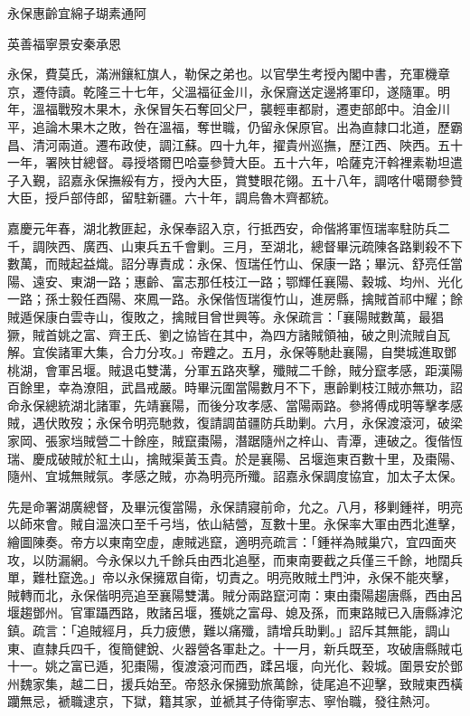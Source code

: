 
\begin{pinyinscope}
永保惠齡宜綿子瑚素通阿

英善福寧景安秦承恩

永保，費莫氏，滿洲鑲紅旗人，勒保之弟也。以官學生考授內閣中書，充軍機章京，遷侍讀。乾隆三十七年，父溫福征金川，永保齎送定邊將軍印，遂隨軍。明年，溫福戰歿木果木，永保冒矢石奪回父尸，襲輕車都尉，遷吏部郎中。洎金川平，追論木果木之敗，咎在溫福，奪世職，仍留永保原官。出為直隸口北道，歷霸昌、清河兩道。遷布政使，調江蘇。四十九年，擢貴州巡撫，歷江西、陜西。五十一年，署陜甘總督。尋授塔爾巴哈臺參贊大臣。五十六年，哈薩克汗斡裡素勒坦遣子入覲，詔嘉永保撫綏有方，授內大臣，賞雙眼花翎。五十八年，調喀什噶爾參贊大臣，授戶部侍郎，留駐新疆。六十年，調烏魯木齊都統。

嘉慶元年春，湖北教匪起，永保奉詔入京，行抵西安，命偕將軍恆瑞率駐防兵二千，調陜西、廣西、山東兵五千會剿。三月，至湖北，總督畢沅疏陳各路剿殺不下數萬，而賊起益熾。詔分專責成：永保、恆瑞任竹山、保康一路；畢沅、舒亮任當陽、遠安、東湖一路；惠齡、富志那任枝江一路；鄂輝任襄陽、穀城、均州、光化一路；孫士毅任酉陽、來鳳一路。永保偕恆瑞復竹山，進房縣，擒賊首祁中耀；餘賊遁保康白雲寺山，復敗之，擒賊目曾世興等。永保疏言：「襄陽賊數萬，最猖獗，賊首姚之富、齊王氏、劉之協皆在其中，為四方諸賊領袖，破之則流賊自瓦解。宜俟諸軍大集，合力分攻。」帝韙之。五月，永保等馳赴襄陽，自樊城進取鄧桃湖，會軍呂堰。賊退屯雙溝，分軍五路夾擊，殲賊二千餘，賊分竄孝感，距漢陽百餘里，幸為潦阻，武昌戒嚴。時畢沅圍當陽數月不下，惠齡剿枝江賊亦無功，詔命永保總統湖北諸軍，先靖襄陽，而後分攻孝感、當陽兩路。參將傅成明等擊孝感賊，遇伏敗歿；永保令明亮馳救，復請調苗疆防兵助剿。六月，永保渡滾河，破梁家岡、張家垱賊營二十餘座，賊竄棗陽，潛踞隨州之梓山、青潭，連破之。復偕恆瑞、慶成破賊於紅土山，擒賊渠黃玉貴。於是襄陽、呂堰迤東百數十里，及棗陽、隨州、宜城無賊氛。孝感之賊，亦為明亮所殲。詔嘉永保調度協宜，加太子太保。

先是命署湖廣總督，及畢沅復當陽，永保請寢前命，允之。八月，移剿鍾祥，明亮以師來會。賊自溫浹口至千弓垱，依山結營，亙數十里。永保率大軍由西北進擊，繪圖陳奏。帝方以東南空虛，慮賊逃竄，適明亮疏言：「鍾祥為賊巢穴，宜四面夾攻，以防漏網。今永保以九千餘兵由西北追壓，而東南要截之兵僅三千餘，地闊兵單，難杜竄逸。」帝以永保擁眾自衛，切責之。明亮敗賊土門沖，永保不能夾擊，賊轉而北，永保偕明亮追至襄陽雙溝。賊分兩路竄河南：東由棗陽趨唐縣，西由呂堰趨鄧州。官軍躡西路，敗諸呂堰，獲姚之富母、媳及孫，而東路賊已入唐縣滹沱鎮。疏言：「追賊經月，兵力疲憊，難以痛殲，請增兵助剿。」詔斥其無能，調山東、直隸兵四千，復簡健銳、火器營各軍赴之。十一月，新兵既至，攻破唐縣賊屯十一。姚之富已遁，犯棗陽，復渡滾河而西，蹂呂堰，向光化、穀城。圍景安於鄧州魏家集，越二日，援兵始至。帝怒永保擁勁旅萬餘，徒尾追不迎擊，致賊東西橫躪無忌，褫職逮京，下獄，籍其家，並褫其子侍衛寧志、寧怡職，發往熱河。


\end{pinyinscope}
